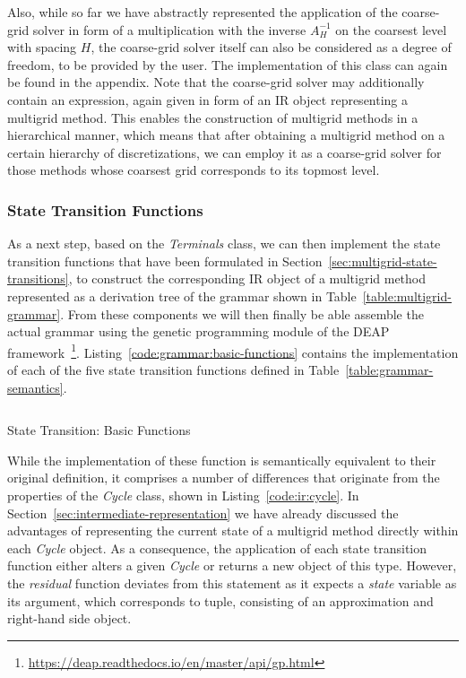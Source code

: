 Also, while so far we have abstractly represented the application of the coarse-grid solver in form of a multiplication with the inverse $A^{-1}_H$ on the coarsest level with spacing $H$, the coarse-grid solver itself can also be considered as a degree of freedom, to be provided by the user.
The implementation of this class can again be found in the appendix.
Note that the coarse-grid solver may additionally contain an expression, again given in form of an IR object representing a multigrid method.
This enables the construction of multigrid methods in a hierarchical manner, which means that after obtaining a multigrid method on a certain hierarchy of discretizations, we can employ it as a coarse-grid solver for those methods whose coarsest grid corresponds to its topmost level.

\subsubsection{State Transition Functions}
As a next step, based on the \emph{Terminals} class, we can then implement the state transition functions that have been formulated in Section~\ref{sec:multigrid-state-transitions}, to construct the corresponding IR object of a multigrid method represented as a derivation tree of the grammar shown in Table~\ref{table:multigrid-grammar}.
From these components we will then finally be able assemble the actual grammar using the genetic programming module of the DEAP framework~\footnote{\url{https://deap.readthedocs.io/en/master/api/gp.html}}.
Listing~\ref{code:grammar:basic-functions} contains the implementation of each of the five state transition functions defined in Table~\ref{table:grammar-semantics}.
\begin{listing}
	\inputminted{python}{evostencils/grammar/base.py}
	\caption{State Transition: Basic Functions}
	\label{code:grammar:basic-functions}
\end{listing}
While the implementation of these function is semantically equivalent to their original definition, it comprises a number of differences that originate from the properties of the \emph{Cycle} class, shown in Listing~\ref{code:ir:cycle}.
In Section~\ref{sec:intermediate-representation} we have already discussed the advantages of representing the current state of a multigrid method directly within each \emph{Cycle} object.
As a consequence, the application of each state transition function either alters a given \emph{Cycle} or returns a new object of this type.
However, the \emph{residual} function deviates from this statement as it expects a \emph{state} variable as its argument, which corresponds to tuple, consisting of an approximation and right-hand side object.
